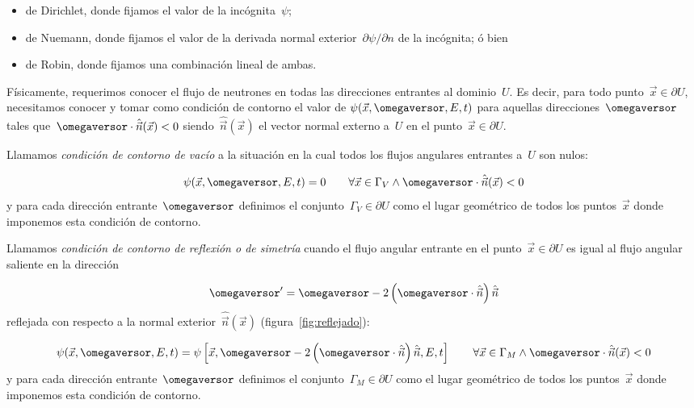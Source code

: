 \begin{itemize}
 \item de Dirichlet, donde fijamos el valor de la incógnita~$\psi$;
 \item de Nuemann, donde fijamos el valor de la derivada normal exterior~$\partial \psi/\partial n$ de la incógnita; ó bien
 \item de Robin, donde fijamos una combinación lineal de ambas.
\end{itemize}

Físicamente, requerimos conocer el flujo de neutrones en todas las direcciones entrantes al dominio~$U$. Es decir, para todo punto~$\vec{x} \in \partial U$, necesitamos conocer y tomar como condición de contorno el valor de $\psi(\vec{x}, \omegaversor, E, t)$ para aquellas direcciones~$\omegaversor$ tales que~$\omegaversor \cdot \hat{\vec{n}}(\vec{x}) < 0$ siendo~$\hat{\vec{n}}(\vec{x})$ el vector normal externo a~$U$ en el punto~$\vec{x} \in \partial U$.

\begin{definicion}
\label{def:ccvacuum}
Llamamos \emph{condición de contorno de vacío} a la situación en la cual todos los flujos angulares entrantes a~$U$ son nulos:

\begin{equation*}
\psi(\vec{x}, \omegaversor, E, t) = 0 \quad\quad \forall \vec{x} \in \Gamma_V \wedge \omegaversor \cdot \hat{\vec{n}}(\vec{x}) < 0
\end{equation*}
%
y para cada dirección entrante~$\omegaversor$ definimos el conjunto~$\Gamma_V \in \partial U$ como el lugar geométrico de todos los puntos~$\vec{x}$ donde imponemos esta condición de contorno.
\end{definicion}

\begin{definicion}
\label{def:ccmirror}
Llamamos \emph{condición de contorno de reflexión o de simetría} cuando el flujo angular entrante en el punto~$\vec{x} \in \partial U$ es igual al flujo angular saliente en la dirección

\begin{equation}\label{eq:reflexion}
\omegaversor^{\prime} = \omegaversor - 2 \left( \omegaversor \cdot \hat{\vec{n}} \right) \hat{\vec{n}}
\end{equation}
%
reflejada con respecto a la normal exterior~$\hat{\vec{n}}(\vec{x})$ (figura~\ref{fig:reflejado}):

\begin{equation*}
\psi(\vec{x}, \omegaversor, E, t) = \psi\left[\vec{x}, \omegaversor - 2 \left( \omegaversor \cdot \hat{\vec{n}} \right) \hat{\vec{n}}, E, t\right]  \quad\quad \forall \vec{x} \in \Gamma_M \wedge \omegaversor \cdot \hat{\vec{n}}(\vec{x}) < 0
\end{equation*}
y para cada dirección entrante~$\omegaversor$ definimos el conjunto~$\Gamma_M \in \partial U$ como el lugar geométrico de todos los puntos~$\vec{x}$ donde imponemos esta condición de contorno.
\end{definicion}

